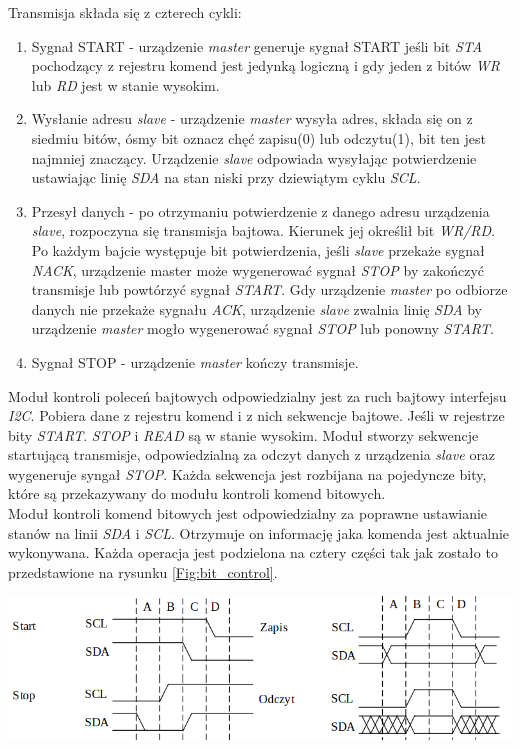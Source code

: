 \documentclass[11pt,a4paper]{article}
\begin{document}
	Transmisja składa się z czterech cykli:
	\begin{enumerate}
		\item Sygnał START - urządzenie \textit{master} generuje sygnał START jeśli bit \textit{STA} pochodzący z rejestru komend jest jedynką logiczną i gdy jeden z bitów \textit{WR} lub \textit{RD} jest w stanie wysokim.
		\item Wysłanie adresu \textit{slave} - urządzenie \textit{master} wysyła adres, składa się on z siedmiu bitów, ósmy bit oznacz chęć zapisu(0) lub odczytu(1), bit ten jest najmniej znaczący. Urządzenie \textit{slave} odpowiada wysyłając potwierdzenie ustawiając linię \textit{SDA} na stan niski przy dziewiątym cyklu \textit{SCL}.
		\item Przesył danych - po otrzymaniu potwierdzenie z danego adresu urządzenia \textit{slave}, rozpoczyna się transmisja bajtowa. Kierunek jej określił bit \textit{WR/RD}. Po każdym bajcie występuje bit potwierdzenia, jeśli \textit{slave} przekaże sygnał \textit{NACK}, urządzenie master może wygenerować  sygnał \textit{STOP} by zakończyć transmisje lub powtórzyć sygnał \textit{START}. Gdy urządzenie \textit{master} po odbiorze danych nie przekaże sygnału \textit{ACK}, urządzenie \textit{slave} zwalnia linię \textit{SDA} by urządzenie \textit{master} mogło wygenerować sygnał \textit{STOP} lub ponowny \textit{START}.
		\item Sygnał STOP - urządzenie \textit{master} kończy transmisje.
	\end{enumerate}
	Moduł kontroli poleceń bajtowych odpowiedzialny jest za ruch bajtowy interfejsu \textit{I2C}. Pobiera dane z rejestru komend i z nich sekwencje bajtowe. Jeśli w rejestrze bity \textit{START}. \textit{STOP} i \textit{READ} są w stanie wysokim. Moduł stworzy sekwencje startującą transmisje, odpowiedzialną za odczyt danych z urządzenia \textit{slave} oraz wygeneruje syngał \textit{STOP}. Każda sekwencja jest rozbijana na pojedyncze bity, które są przekazywany do modułu kontroli komend bitowych.\\
	Moduł kontroli komend bitowych jest odpowiedzialny za poprawne ustawianie stanów na linii \textit{SDA} i \textit{SCL}. Otrzymuje on informację jaka komenda jest aktualnie wykonywana. Każda operacja jest podzielona na cztery części tak jak zostało to przedstawione na rysunku \ref{Fig:bit_control}.\\
		\begin{minipage}[c]{\textwidth}

					\includegraphics[width=\textwidth]{./rysunki/i2c_bit.png}
	\end{minipage} 
\end{document}
